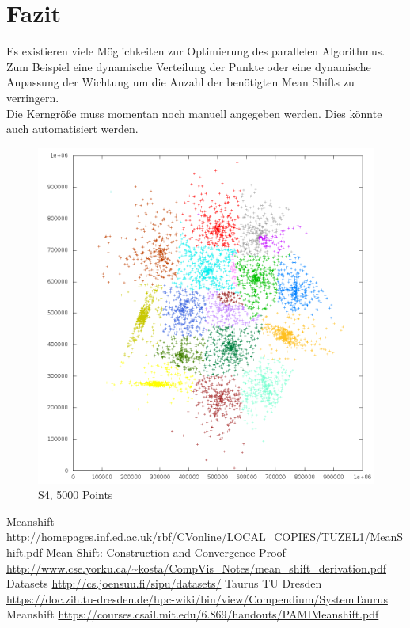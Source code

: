 \section{Fazit}
	Es existieren viele Möglichkeiten zur Optimierung des parallelen Algorithmus. Zum Beispiel eine dynamische Verteilung der Punkte oder eine dynamische Anpassung
	der Wichtung um die Anzahl der benötigten Mean Shifts zu verringern.\\
	Die Kerngröße muss momentan noch manuell angegeben werden. Dies könnte auch automatisiert werden.\\
	\begin{figure}[H]
		\centering
		\includegraphics[scale=0.6]{../meanshift/output/pics/s4_colored.png} 
		\caption{S4, 5000 Points}
	\end{figure}
\begin{thebibliography}{999}
	\bibitem [0] {} Meanshift \url{http://homepages.inf.ed.ac.uk/rbf/CVonline/LOCAL_COPIES/TUZEL1/MeanShift.pdf}
	\bibitem [1] {} Mean Shift: Construction and Convergence Proof \url{http://www.cse.yorku.ca/~kosta/CompVis_Notes/mean_shift_derivation.pdf}
	\bibitem [2] {} Datasets \url{http://cs.joensuu.fi/sipu/datasets/}
	\bibitem [3] {} Taurus TU Dresden \url{https://doc.zih.tu-dresden.de/hpc-wiki/bin/view/Compendium/SystemTaurus}
	\bibitem [4] {} Meanshift \url{https://courses.csail.mit.edu/6.869/handouts/PAMIMeanshift.pdf}
	\newline
\end{thebibliography}
